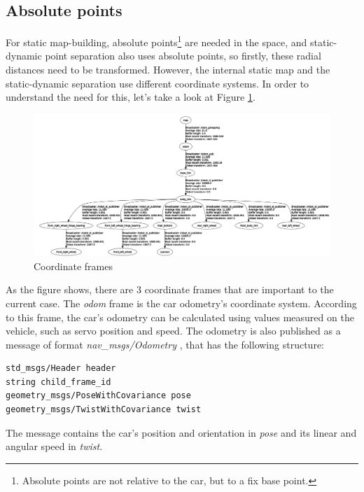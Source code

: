 \subsection{Absolute points}
\label{chap:absolute_points}
For static map-building, absolute points\footnote{Absolute points are not relative to the car, but to a fix base point.} are needed in the space, and static-dynamic point separation also uses absolute points, so firstly, these radial distances need to be transformed. However, the internal static map and the static-dynamic separation use different coordinate systems. In order to understand the need for this, let's take a look at Figure \ref{rqt_input}.

\begin{figure}[!ht]
    \centering
    \includegraphics[width=\textwidth]{figures/raw/rqt_input.png}
    \caption{Coordinate frames}
    \label{rqt_input}
\end{figure}

As the figure shows, there are 3 coordinate frames that are important to the current case. The \textit{odom} frame is the car odometry's coordinate system. According to this frame, the car's odometry can be calculated using values measured on the vehicle, such as servo position and speed. The odometry is also published as a message of format \textit{nav\_msgs/Odometry} \cite{ros_msg_Odometry}, that has the following structure:

\begin{minipage}{\textwidth}
\begin{lstlisting}[language=IDL]
std_msgs/Header header
string child_frame_id
geometry_msgs/PoseWithCovariance pose
geometry_msgs/TwistWithCovariance twist
\end{lstlisting}
\end{minipage}

The message contains the car's position and orientation in \textit{pose} and its linear and angular speed in \textit{twist}.

